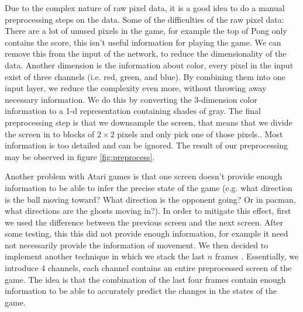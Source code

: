 \documentclass{article}
\begin{document}
Due to the complex nature of raw pixel data, it is a good idea to do a manual preprocessing steps on the data. Some of the difficulties of the raw pixel data: There are a lot of unused pixels in the game, for example the top of Pong only contains the score, this isn't useful information for playing the game. We can remove this from the input of the network, to reduce the dimensionality of the data. Another dimension is the information about color, every pixel in the input exist of three channels (i.e. red, green, and blue). By combining them into one input layer, we reduce the complexity even more, without throwing away necessary information. We do this by converting the 3-dimension color information to a 1-d representation containing shades of gray. The final preprocessing step is that we downsample the screen, that means that we divide the screen in to blocks of $2\times2$ pixels and only pick one of those pixels.. Most information is too detailed and can be ignored. The result of our preprocessing may be observed in figure \ref{fig:preprocess}. 

Another problem with Atari games is that one screen doesn't provide enough information to be able to infer the precise state of the game (e.g. what direction is the ball moving toward? What direction is the opponent going? Or in pacman, what directions are the ghosts moving in?). In order to mitigate this effect, first we used the difference between the previous screen and the next screen. After some testing, this this did not provide enough information, for example it need not necessarily provide the information of movement. We then decided to implement another technique in which we stack the last $n$ frames \cite{mnih2013playing}. Essentially, we introduce 4 channels, each channel contains an entire preprocessed screen of the game. The idea is that the combination of the last four frames contain enough information to be able to accurately predict the changes in the states of the game.
\end{document}
